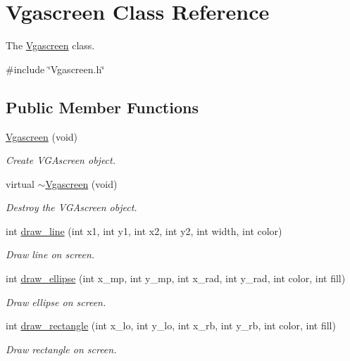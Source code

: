 \hypertarget{class_vgascreen}{}\section{Vgascreen Class Reference}
\label{class_vgascreen}


The \mbox{\hyperlink{class_vgascreen}{Vgascreen}} class.  




{\ttfamily \#include \char`\"{}Vgascreen.\+h\char`\"{}}

\subsection*{Public Member Functions}
\begin{DoxyCompactItemize}
\item 
\mbox{\hyperlink{class_vgascreen_ad5914fac8c1af8491b92dfe780490191}{Vgascreen}} (void)
\begin{DoxyCompactList}\small\item\em Create V\+G\+Ascreen object. \end{DoxyCompactList}\item 
virtual \mbox{\hyperlink{class_vgascreen_aac39d059f15042b0d763c6a173540552}{$\sim$\+Vgascreen}} (void)
\begin{DoxyCompactList}\small\item\em Destroy the V\+G\+Ascreen object. \end{DoxyCompactList}\item 
int \mbox{\hyperlink{class_vgascreen_a10bbbae525020dcbd62b42ec3698bb0d}{draw\+\_\+line}} (int x1, int y1, int x2, int y2, int width, int color)
\begin{DoxyCompactList}\small\item\em Draw line on screen. \end{DoxyCompactList}\item 
int \mbox{\hyperlink{class_vgascreen_a5a7c38666c7bb33e7f75a2226505e002}{draw\+\_\+ellipse}} (int x\+\_\+mp, int y\+\_\+mp, int x\+\_\+rad, int y\+\_\+rad, int color, int fill)
\begin{DoxyCompactList}\small\item\em Draw ellipse on screen. \end{DoxyCompactList}\item 
int \mbox{\hyperlink{class_vgascreen_a27d717ae66ae00c3e8a88591b98b248c}{draw\+\_\+rectangle}} (int x\+\_\+lo, int y\+\_\+lo, int x\+\_\+rb, int y\+\_\+rb, int color, int fill)
\begin{DoxyCompactList}\small\item\em Draw rectangle on screen. \end{DoxyCompactList}\item 

\end{DoxyCompactItemize}
